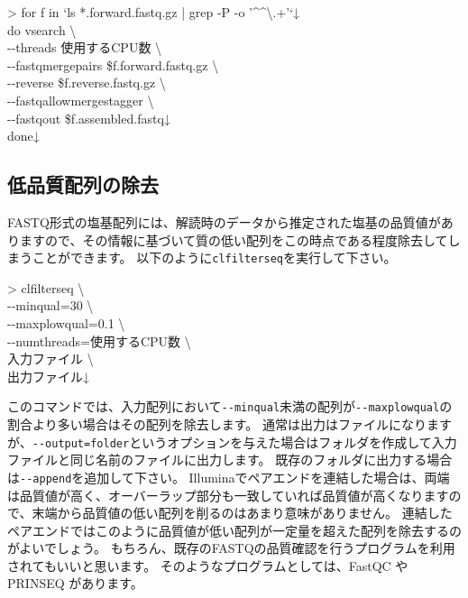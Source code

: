 \documentclass[titlepage,10pt,a4paper]{jsbook}
\newenvironment{cmd}{\begin{oframed}\raggedright\ttfamily\footnotesize\setlength{\baselineskip}{1.4em}}{\end{oframed}\vspace{-1em}}
\begin{document}
\begin{cmd}
{\textgreater} for f in `ls *.forward.fastq.gz | grep -P -o '{\textasciicircum}{\lbrack}{\textasciicircum}{\textbackslash}.{\rbrack}+'`↓\\
do vsearch {\textbackslash}\\
{-}{-}threads 使用するCPU数 {\textbackslash}\\
{-}{-}fastq{\textunderscore}mergepairs \$f.forward.fastq.gz {\textbackslash}\\
{-}{-}reverse \$f.reverse.fastq.gz {\textbackslash}\\
{-}{-}fastq{\textunderscore}allowmergestagger {\textbackslash}\\
{-}{-}fastqout \$f.assembled.fastq↓\\
done↓
\end{cmd}

\subsection{低品質配列の除去}

FASTQ形式の塩基配列には、解読時のデータから推定された塩基の品質値がありますので、その情報に基づいて質の低い配列をこの時点である程度除去してしまうことができます。
以下のように\texttt{clfilterseq}を実行して下さい。

\begin{cmd}
{\textgreater} clfilterseq {\textbackslash}\\
{-}{-}minqual=30 {\textbackslash}\\
{-}{-}maxplowqual=0.1 {\textbackslash}\\
{-}{-}numthreads=使用するCPU数 {\textbackslash}\\
入力ファイル {\textbackslash}\\
出力ファイル↓
\end{cmd}

このコマンドでは、入力配列において\texttt{{-}{-}minqual}未満の配列が\texttt{{-}{-}maxplowqual}の割合より多い場合はその配列を除去します。
通常は出力はファイルになりますが、\texttt{{-}{-}output=folder}というオプションを与えた場合はフォルダを作成して入力ファイルと同じ名前のファイルに出力します。
既存のフォルダに出力する場合は\texttt{{-}{-}append}を追加して下さい。
Illuminaでペアエンドを連結した場合は、両端は品質値が高く、オーバーラップ部分も一致していれば品質値が高くなりますので、末端から品質値の低い配列を削るのはあまり意味がありません。
連結したペアエンドではこのように品質値が低い配列が一定量を超えた配列を除去するのがよいでしょう。
もちろん、既存のFASTQの品質確認を行うプログラムを利用されてもいいと思います。
そのようなプログラムとしては、FastQC \citep{Andrews2010}やPRINSEQ \citep{Schmieder2011}があります。
\end{document}

